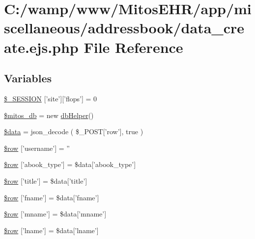 \hypertarget{miscellaneous_2addressbook_2data__create_8ejs_8php}{\section{\-C\-:/wamp/www/\-Mitos\-E\-H\-R/app/miscellaneous/addressbook/data\-\_\-create.ejs.\-php \-File \-Reference}
\label{miscellaneous_2addressbook_2data__create_8ejs_8php}
}
\subsection*{\-Variables}
\begin{DoxyCompactItemize}
\item 
\hyperlink{miscellaneous_2addressbook_2data__create_8ejs_8php_a99fda8552a3e58235643b79f5af3ded8}{\$\-\_\-\-S\-E\-S\-S\-I\-O\-N} \mbox{[}'site'\mbox{]}\mbox{[}'flops'\mbox{]} = 0
\item 
\hyperlink{miscellaneous_2addressbook_2data__create_8ejs_8php_ab5d961f93efe4e2e8d8374f01dd6c65a}{\$mitos\-\_\-db} = new \hyperlink{classdb_helper}{db\-Helper}()
\item 
\hyperlink{miscellaneous_2addressbook_2data__create_8ejs_8php_a6efc15b5a2314dd4b5aaa556a375c6d6}{\$data} = json\-\_\-decode ( \$\-\_\-\-P\-O\-S\-T\mbox{[}'row'\mbox{]}, true )
\item 
\hyperlink{miscellaneous_2addressbook_2data__create_8ejs_8php_a295f1f123154a1040916c8b9b94d8545}{\$row} \mbox{[}'username'\mbox{]} = ''
\item 
\hyperlink{miscellaneous_2addressbook_2data__create_8ejs_8php_a0d1b6e8abe038ac8d97ac3bcaffc1aec}{\$row} \mbox{[}'abook\-\_\-type'\mbox{]} = \$data\mbox{[}'abook\-\_\-type'\mbox{]}
\item 
\hyperlink{miscellaneous_2addressbook_2data__create_8ejs_8php_a70d36cba6a35524466f2a4c8112c8e4e}{\$row} \mbox{[}'title'\mbox{]} = \$data\mbox{[}'title'\mbox{]}
\item 
\hyperlink{miscellaneous_2addressbook_2data__create_8ejs_8php_a5e241e1f48972b6bd961b356bd5b0b66}{\$row} \mbox{[}'fname'\mbox{]} = \$data\mbox{[}'fname'\mbox{]}
\item 
\hyperlink{miscellaneous_2addressbook_2data__create_8ejs_8php_a59969ea1bfb7b642d6dc27ce674d53c7}{\$row} \mbox{[}'mname'\mbox{]} = \$data\mbox{[}'mname'\mbox{]}
\item 
\hyperlink{miscellaneous_2addressbook_2data__create_8ejs_8php_a448ec3d1709d6ded284a6a9f4e6dbf5c}{\$row} \mbox{[}'lname'\mbox{]} = \$data\mbox{[}'lname'\mbox{]}

\end{DoxyCompactItemize}
